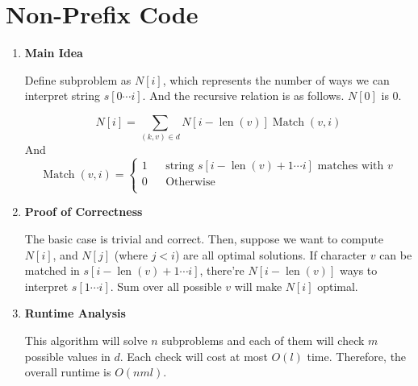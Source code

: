 \documentclass[11pt]{article}
\newenvironment{qparts}{\begin{enumerate}[{(}a{)}]}{\end{enumerate}}
\begin{document}
\section{Non-Prefix Code}
\begin{qparts}
	\item \textbf{Main Idea}
	
	Define subproblem as $N[i]$, which represents the number of ways we can interpret string $s[0 \cdots i]$. And the recursive relation is as follows. $N[0]$ is 0.
	
	\[
		N[i] = \sum_{(k, v) \in d} N[i - \operatorname{len}(v)] \operatorname{Match}(v, i)
	\]
	And
	\[ \operatorname{Match}(v, i) = 
	\left\{
		\begin{array}{rcl}
			1     &      & \text{string } s[i - \operatorname{len}(v) + 1 \cdots i] \text{ matches with } v  \\
			0      &      & \text{Otherwise}  \\
		\end{array}
	\right.
	\]
	\item \textbf{Proof of Correctness}
	
	The basic case is trivial and correct. Then, suppose we want to compute $N[i]$, and $N[j]$ (where $j<i$) are all optimal solutions. If character $v$ can be matched in $s[i - \operatorname{len}(v) + 1 \cdots i]$, there're $N[i - \operatorname{len}(v)]$ ways to interpret $s[1 \cdots i]$. Sum over all possible $v$ will make $N[i]$ optimal.
	
	
	\item \textbf{Runtime Analysis}
	
	This algorithm will solve $n$ subproblems and each of them will check $m$ possible values in $d$. Each check will cost at most $O(l)$ time. Therefore, the overall runtime is $O(nml)$.
	

\end{qparts}

\newpage
\end{document}
